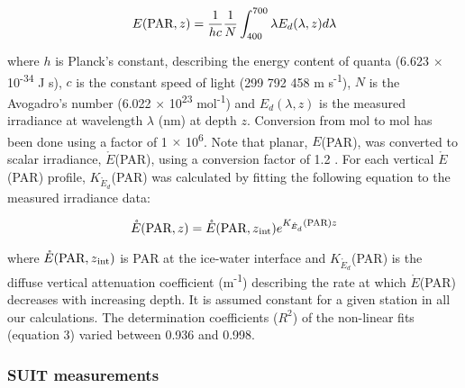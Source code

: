 \documentclass[draft]{agujournal2018}
\newcommand{\kdparscalar}{\ensuremath{K_{\mathring{E}_d}}(\textnormal{PAR})}
\newcommand{\epar}{\ensuremath{E}(\textnormal{PAR})}
\newcommand{\eparz}{\ensuremath{E(\textnormal{PAR}, z)}}
\newcommand{\edlambdaz}{\ensuremath{{E_d(\lambda, z)}}}
\newcommand{\eparscalar}{\ensuremath{\mathring{E}}(\textnormal{PAR})}
\newcommand{\eparzscalar}{\ensuremath{\mathring{E}(\textnormal{PAR}, z)}}
\newcommand{\eparzintscalar}{\ensuremath{\mathring{E}(\textnormal{PAR}, z\textsubscript{int})}}
\newcommand{\mminus}{m\textsuperscript{-1}}
\begin{document}
\begin{linenomath*}
    \begin{equation}
		\eparz{} = \frac{1}{hc} \frac{1}{N} \int_{400}^{700} \lambda E_d(\lambda, z)d\lambda
	\end{equation}
\end{linenomath*}

\noindent where $h$ is Planck's constant, describing the energy content of quanta (6.623 $\times$ 10\textsuperscript{-34} J s), $c$ is the constant speed of light (299 792 458 m s\textsuperscript{-1}), $N$ is the Avogadro's number (6.022 $\times$ 10\textsuperscript{23} mol\textsuperscript{-1}) and \edlambdaz{} is the measured irradiance at wavelength $\lambda$ (nm) at depth $z$. Conversion from mol to \textmu mol has been done using a factor of 1 $\times$ 10\textsuperscript{6}. Note that planar, \epar{}, was converted to scalar irradiance, \eparscalar{}, using a conversion factor of 1.2 \citep{Toole2003}. For each vertical \eparscalar{} profile, \kdparscalar{} was calculated by fitting the following equation to the measured irradiance data:

\begin{linenomath*}
    \begin{equation}
		\eparzscalar{} = \eparzintscalar{} e^{\kdparscalar{}z}
	\end{equation}
\end{linenomath*}

where \eparzintscalar{} is PAR at the ice-water interface and \kdparscalar{} is the diffuse vertical attenuation coefficient (\mminus{}) describing the rate at which \eparscalar{} decreases with increasing depth. It is assumed constant for a given station in all our calculations. The determination coefficients ($R^2$) of the non-linear fits (equation 3) varied between 0.936 and 0.998.

\subsubsection{SUIT measurements}
\end{document}
